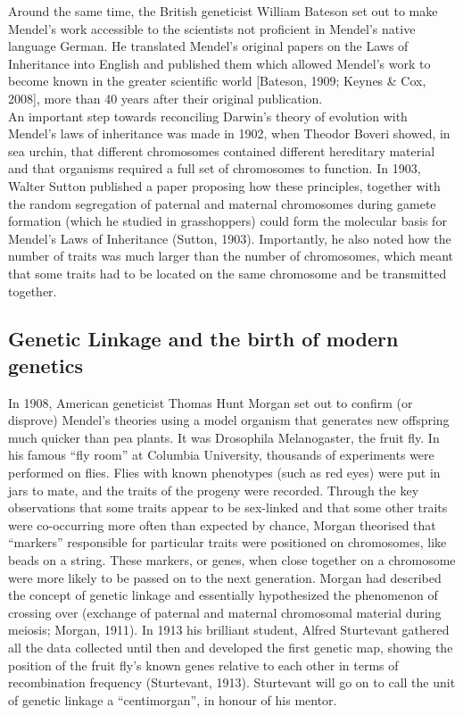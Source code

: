 Around the same time, the British geneticist William Bateson set out to make Mendel’s work accessible to the scientists not proficient in Mendel’s native language German.
He translated Mendel’s original papers on the Laws of Inheritance into English and published them which allowed Mendel’s work to become known in the greater scientific world [Bateson, 1909; Keynes \& Cox, 2008], more than 40 years after their original publication.\\ 

An important step towards reconciling Darwin’s theory of evolution with Mendel’s laws of inheritance was made in 1902, when Theodor Boveri showed, in sea urchin, that different chromosomes contained different hereditary material and that organisms required a full set of chromosomes to function. 
In 1903, Walter Sutton published a paper proposing how these principles, together with the random segregation of paternal and maternal chromosomes during gamete formation (which he studied in grasshoppers) could form the molecular basis for Mendel’s Laws of Inheritance (Sutton, 1903). 
Importantly, he also noted how the number of traits was much larger than the number of chromosomes, which meant that some traits had to be located on the same chromosome and be transmitted together.\\

\subsection{Genetic Linkage and the birth of modern genetics} %

In 1908, American geneticist Thomas Hunt Morgan set out to confirm (or disprove) Mendel’s theories using a model organism that generates new offspring much quicker than pea plants. 
It was Drosophila Melanogaster, the fruit fly. 
In his famous “fly room” at Columbia University, thousands of experiments were performed on flies. 
Flies with known phenotypes (such as red eyes) were put in jars to mate, and the traits of the progeny were recorded. 
Through the key observations that some traits appear to be sex-linked and that some other traits were co-occurring more often than expected by chance, Morgan theorised that “markers” responsible for particular traits were positioned on chromosomes, like beads on a string. 
These markers, or genes, when close together on a chromosome were more likely to be passed on to the next generation. 
Morgan had described the concept of genetic linkage and essentially hypothesized the phenomenon of crossing over (exchange of paternal and maternal chromosomal material during meiosis; Morgan, 1911). 
In 1913 his brilliant student, Alfred Sturtevant gathered all the data collected until then and developed the first genetic map, showing the position of the fruit fly’s known genes relative to each other in terms of recombination frequency (Sturtevant, 1913). 
Sturtevant will go on to call the unit of genetic linkage a “centimorgan”, in honour of his mentor.\\

